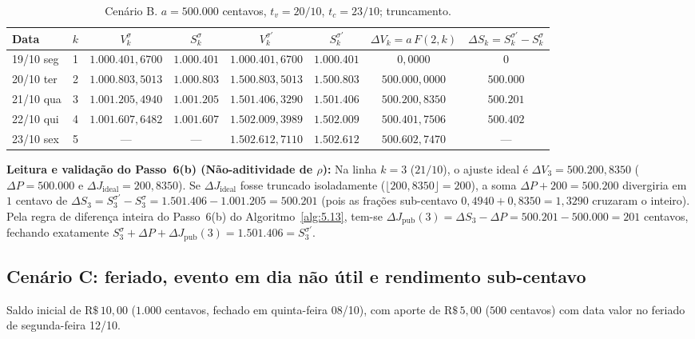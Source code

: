 \documentclass[11pt, a4paper]{article}
\theoremstyle{definition}
\theoremstyle{plain}
\theoremstyle{remark}
\begin{document}
\begin{table}[htbp]
\centering
\small
\begin{tabular}{@{}lccccccc@{}}
\toprule
\textbf{Data} & $k$ & $V_k^\sigma$ & $S_k^\sigma$ & $V_k^{\sigma'}$ & $S_k^{\sigma'}$ & $\Delta V_k = a\,F(2,k)$ & $\Delta S_k = S_k^{\sigma'} - S_k^\sigma$ \\
\midrule
19/10 seg & 1 & $1.000.401{,}6700$ & $1.000.401$ & $1.000.401{,}6700$ & $1.000.401$ & $0{,}0000$       & $0$ \\
20/10 ter & 2 & $1.000.803{,}5013$ & $1.000.803$ & $1.500.803{,}5013$ & $1.500.803$ & $500.000{,}0000$ & $500.000$ \\
21/10 qua & 3 & $1.001.205{,}4940$ & $1.001.205$ & $1.501.406{,}3290$ & $1.501.406$ & $500.200{,}8350$ & $500.201$ \\
22/10 qui & 4 & $1.001.607{,}6482$ & $1.001.607$ & $1.502.009{,}3989$ & $1.502.009$ & $500.401{,}7506$ & $500.402$ \\
23/10 sex & 5 & ---                & ---         & $1.502.612{,}7110$ & $1.502.612$ & $500.602{,}7470$ & --- \\
\bottomrule
\end{tabular}
\caption{Cenário B. $a = 500.000$ centavos, $t_v = 20/10$, $t_c = 23/10$; truncamento.}
\label{tab:7}
\end{table}

\textbf{Leitura e validação do Passo~6(b) (Não-aditividade de $\rho$):} Na linha $k=3$ ($21/10$), o ajuste ideal é $\Delta V_3 = 500.200{,}8350$ ($\Delta P = 500.000$ e $\Delta J_{\text{ideal}} = 200{,}8350$). Se $\Delta J_{\text{ideal}}$ fosse truncado isoladamente ($\lfloor 200{,}8350 \rfloor = 200$), a soma $\Delta P + 200 = 500.200$ divergiria em $1$ centavo de $\Delta S_3 = S_3^{\sigma'} - S_3^\sigma = 1.501.406 - 1.001.205 = 500.201$ (pois as frações sub-centavo $0{,}4940 + 0{,}8350 = 1{,}3290$ cruzaram o inteiro). Pela regra de diferença inteira do Passo~6(b) do Algoritmo~\ref{alg:5.13}, tem-se $\Delta J_{\text{pub}}(3) = \Delta S_3 - \Delta P = 500.201 - 500.000 = 201$ centavos, fechando exatamente $S_3^\sigma + \Delta P + \Delta J_{\text{pub}}(3) = 1.501.406 = S_3^{\sigma'}$.

\subsection{Cenário C: feriado, evento em dia não útil e rendimento sub-centavo}\label{sec:7.3}

Saldo inicial de $\text{R\$}\,10{,}00$ ($1.000$ centavos, fechado em quinta-feira 08/10), com aporte de $\text{R\$}\,5{,}00$ ($500$ centavos) com data valor no feriado de segunda-feira 12/10.
\end{document}
